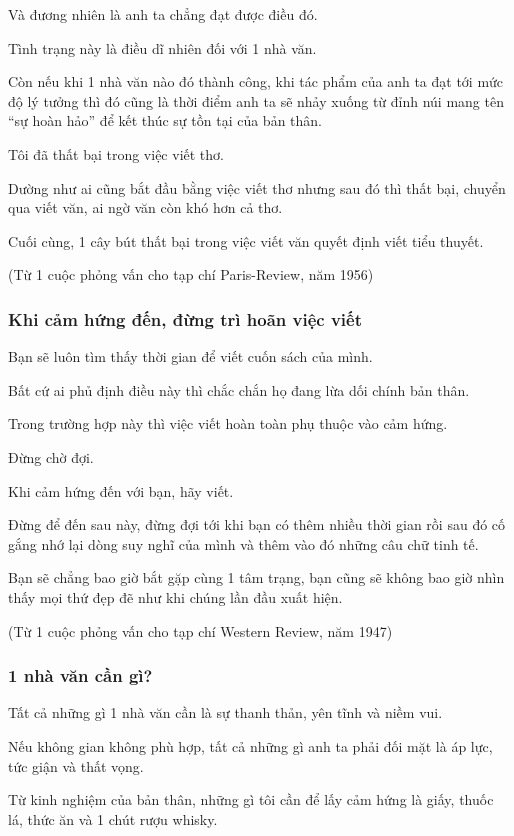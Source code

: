 \documentclass{article}
\begin{document}
Và đương nhiên là anh ta chẳng đạt được điều đó.

Tình trạng này là điều dĩ nhiên đối với 1 nhà văn.

Còn nếu khi 1 nhà văn nào đó thành công, khi tác phẩm của anh ta đạt tới mức độ lý tưởng thì đó cũng là thời điểm anh ta sẽ nhảy xuống từ đỉnh núi mang tên ``sự hoàn hảo'' để kết thúc sự tồn tại của bản thân.

Tôi đã thất bại trong việc viết thơ.

Dường như ai cũng bắt đầu bằng việc viết thơ nhưng sau đó thì thất bại, chuyển qua viết văn, ai ngờ văn còn khó hơn cả thơ.

Cuối cùng, 1 cây bút thất bại trong việc viết văn quyết định viết tiểu thuyết.

(Từ 1 cuộc phỏng vấn cho tạp chí Paris-Review, năm 1956)

\subsubsection{Khi cảm hứng đến, đừng trì hoãn việc viết}
Bạn sẽ luôn tìm thấy thời gian để viết cuốn sách của mình.

Bất cứ ai phủ định điều này thì chắc chắn họ đang lừa dối chính bản thân.

Trong trường hợp này thì việc viết hoàn toàn phụ thuộc vào cảm hứng.

Đừng chờ đợi.

Khi cảm hứng đến với bạn, hãy viết.

Đừng để đến sau này, đừng đợi tới khi bạn có thêm nhiều thời gian rồi sau đó cố gắng nhớ lại dòng suy nghĩ của mình và thêm vào đó những câu chữ tinh tế.

Bạn sẽ chẳng bao giờ bắt gặp cùng 1 tâm trạng, bạn cũng sẽ không bao giờ nhìn thấy mọi thứ đẹp đẽ như khi chúng lần đầu xuất hiện.

(Từ 1 cuộc phỏng vấn cho tạp chí Western Review, năm 1947)

\subsubsection{1 nhà văn cần gì?}
Tất cả những gì 1 nhà văn cần là sự thanh thản, yên tĩnh và niềm vui.

Nếu không gian không phù hợp, tất cả những gì anh ta phải đối mặt là áp lực, tức giận và thất vọng.

Từ kinh nghiệm của bản thân, những gì tôi cần để lấy cảm hứng là giấy, thuốc lá, thức ăn và 1 chút rượu whisky.
\end{document}
